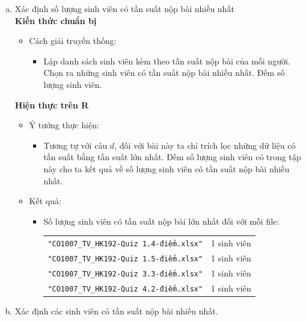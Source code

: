 \documentclass[a4paper]{article}
\theoremstyle{definition}
\begin{document}
\begin{enumerate}[a)]
\begin{itemize}
    \end{itemize}
    \bf\item {Xác định số lượng sinh viên có tần suất nộp bài nhiều nhất}\\[6pt]
    \bf Kiến thức chuẩn bị\normalfont
    \begin{itemize}
        \item Cách giải truyền thống:
        \begin{itemize}
            \item Lập danh sách sinh viên kèm theo tần suất nộp bài của mỗi người. Chọn ra những sinh viên có tần suất nộp bài nhiều nhất. Đếm số lượng sinh viên.
        \end{itemize}
    \end{itemize}
    \bf Hiện thực trên R\normalfont
    \begin{itemize}
        \item Ý tưởng thực hiện:
        \begin{itemize}
            \item Tương tự với câu $d$, đối với bài này ta chỉ trích lọc những dữ liệu có tần suất bằng tần suất lớn nhất. Đếm số lượng sinh viên có trong tập này cho ta kết quả về số lượng sinh viên có tần suất nộp bài nhiều nhất.
        \end{itemize}
        \item Kết quả:
        \begin{itemize}
            \item Số lượng sinh viên có tần suất nộp bài lớn nhất đối với mỗi file:
            \begin{center}
                \begin{tabular}{l l}
                     \texttt{"CO1007\_TV\_HK192-Quiz 1.4-điểm.xlsx"} & 1 sinh viên\\ 
                     \texttt{"CO1007\_TV\_HK192-Quiz 1.5-điểm.xlsx"} & 1 sinh viên\\ 
                     \texttt{"CO1007\_TV\_HK192-Quiz 3.3-điểm.xlsx"} & 1 sinh viên\\ 
                     \texttt{"CO1007\_TV\_HK192-Quiz 4.2-điểm.xlsx"} & 1 sinh viên\\ 
                \end{tabular}
            \end{center}
        \end{itemize}
    \end{itemize}
    \bf\item {Xác định các sinh viên có tần suất nộp bài nhiều nhất.}\\[6pt]

\end{enumerate}
\end{document}
